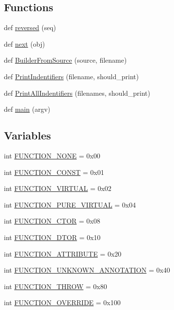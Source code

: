 \subsection*{Functions}
\begin{DoxyCompactItemize}
\item 
def \hyperlink{namespacecpp_1_1ast_a0b1c00fd4aaa476b10de6b3a2550f39f}{reversed} (seq)
\item 
def \hyperlink{namespacecpp_1_1ast_a39ad8261fef5e0a7c1c17c510541b66f}{next} (obj)
\item 
def \hyperlink{namespacecpp_1_1ast_a696471f0d7971a0789824803a008cf6b}{Builder\+From\+Source} (source, filename)
\item 
def \hyperlink{namespacecpp_1_1ast_a6a793b93aff7779af7017d001ce3b226}{Print\+Indentifiers} (filename, should\+\_\+print)
\item 
def \hyperlink{namespacecpp_1_1ast_abc501124095357c1cf56eaf10e1df327}{Print\+All\+Indentifiers} (filenames, should\+\_\+print)
\item 
def \hyperlink{namespacecpp_1_1ast_acd29cc27c3bff13bf3e055575b8e958a}{main} (argv)
\end{DoxyCompactItemize}
\subsection*{Variables}
\begin{DoxyCompactItemize}
\item 
int \hyperlink{namespacecpp_1_1ast_a8f1229df8e1348664a7e6142c2d0ae0b}{F\+U\+N\+C\+T\+I\+O\+N\+\_\+\+N\+O\+NE} = 0x00
\item 
int \hyperlink{namespacecpp_1_1ast_a73fe57808e7f2e3f3e9d0e1088f183be}{F\+U\+N\+C\+T\+I\+O\+N\+\_\+\+C\+O\+N\+ST} = 0x01
\item 
int \hyperlink{namespacecpp_1_1ast_a7d444baf6763d374aa4ef9c3f0e6d5b3}{F\+U\+N\+C\+T\+I\+O\+N\+\_\+\+V\+I\+R\+T\+U\+AL} = 0x02
\item 
int \hyperlink{namespacecpp_1_1ast_ae8f597c9a3e49e1a29e8da1848d40ff1}{F\+U\+N\+C\+T\+I\+O\+N\+\_\+\+P\+U\+R\+E\+\_\+\+V\+I\+R\+T\+U\+AL} = 0x04
\item 
int \hyperlink{namespacecpp_1_1ast_ae380e31bf1bce9757f3289a704715c2d}{F\+U\+N\+C\+T\+I\+O\+N\+\_\+\+C\+T\+OR} = 0x08
\item 
int \hyperlink{namespacecpp_1_1ast_a4491e62237a2689be078bf3b455549e6}{F\+U\+N\+C\+T\+I\+O\+N\+\_\+\+D\+T\+OR} = 0x10
\item 
int \hyperlink{namespacecpp_1_1ast_a6462424cd2b9884f63bf7594811321cd}{F\+U\+N\+C\+T\+I\+O\+N\+\_\+\+A\+T\+T\+R\+I\+B\+U\+TE} = 0x20
\item 
int \hyperlink{namespacecpp_1_1ast_a9d3ba548a6c733892e60c8accdc96639}{F\+U\+N\+C\+T\+I\+O\+N\+\_\+\+U\+N\+K\+N\+O\+W\+N\+\_\+\+A\+N\+N\+O\+T\+A\+T\+I\+ON} = 0x40
\item 
int \hyperlink{namespacecpp_1_1ast_a3384f360da38e3df526d189238118fb5}{F\+U\+N\+C\+T\+I\+O\+N\+\_\+\+T\+H\+R\+OW} = 0x80
\item 
int \hyperlink{namespacecpp_1_1ast_aecf2f8a17fb10fe367d2da84849c06c9}{F\+U\+N\+C\+T\+I\+O\+N\+\_\+\+O\+V\+E\+R\+R\+I\+DE} = 0x100
\end{DoxyCompactItemize}


